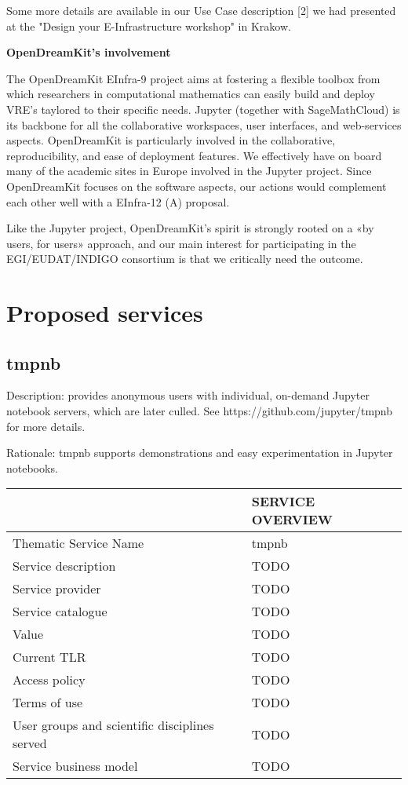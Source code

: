 Some more details are available in our Use Case description [2] we had
presented at the "Design your E-Infrastructure workshop" in Krakow.

\textbf{OpenDreamKit's involvement}

The OpenDreamKit EInfra-9 project aims at fostering a flexible toolbox
from which researchers in computational mathematics can easily build
and deploy VRE's taylored to their specific needs. Jupyter (together
with SageMathCloud) is its backbone for all the collaborative
workspaces, user interfaces, and web-services aspects. OpenDreamKit is
particularly involved in the collaborative, reproducibility, and ease
of deployment features. We effectively have on board many of the
academic sites in Europe involved in the Jupyter project. Since
OpenDreamKit focuses on the software aspects, our actions would
complement each other well with a EInfra-12 (A) proposal.

Like the Jupyter project, OpenDreamKit's spirit is strongly rooted on a «by users,
for users» approach, and our main interest for participating in the EGI/EUDAT/INDIGO consortium is that
we critically need the outcome.

\section{Proposed services}

\subsection{tmpnb}

Description: provides anonymous users with individual, on-demand Jupyter
notebook servers, which are later culled. See https://github.com/jupyter/tmpnb
for more details.

Rationale: tmpnb supports demonstrations and easy experimentation in
Jupyter notebooks.

\begin{tabular}{|l|l|}
\hline
 & SERVICE OVERVIEW\\
\hline
Thematic Service Name&tmpnb\\
\hline
Service description&TODO\\
\hline
Service provider&TODO\\
\hline
Service catalogue&TODO\\
\hline
Value&TODO\\
\hline
Current TLR&TODO\\
\hline
Access policy&TODO\\
\hline
Terms of use&TODO\\
\hline
User groups and scientific disciplines served&TODO\\
\hline
Service business model&TODO\\
\hline
\end{tabular}

